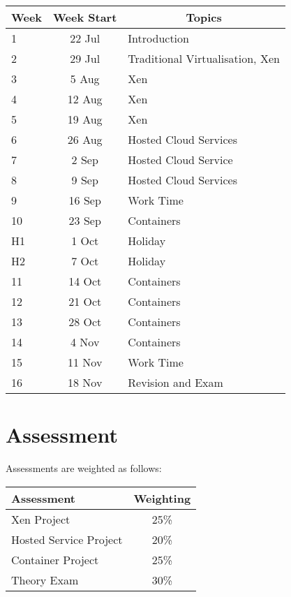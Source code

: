 \documentclass{article}
\begin{document}
\renewcommand{\arraystretch}{1.5}
\begin{tabular}{|l|c|l|}
\hline
 Week & Week Start & \multicolumn{1}{c|}{Topics}             \\ \hline
 1    & 22 Jul     & Introduction                            \\ \hline
 2    & 29 Jul     & Traditional Virtualisation, Xen         \\ \hline
 3    &  5 Aug     & Xen                                     \\ \hline
 4    & 12 Aug     & Xen                                     \\ \hline
 5    & 19 Aug     & Xen                                     \\ \hline
 6    & 26 Aug     & Hosted Cloud Services                   \\ \hline
 7    & 2  Sep     & Hosted Cloud Service                    \\ \hline
 8    & 9  Sep     & Hosted Cloud Services                   \\ \hline
 9    & 16 Sep     & Work Time                               \\ \hline
 10   & 23 Sep     & Containers                              \\ \hline
 H1   & 1  Oct     & Holiday                                 \\ \hline
 H2   & 7  Oct     & Holiday                                 \\ \hline
 11   & 14 Oct     & Containers                              \\ \hline
 12   & 21 Oct     & Containers                              \\ \hline
 13   & 28 Oct     & Containers                              \\ \hline
 14   & 4  Nov     & Containers                              \\ \hline
 15   & 11 Nov     & Work Time                               \\ \hline
 16   & 18 Nov     & Revision and Exam                       \\ \hline
\end{tabular}

\section*{Assessment}

Assessments are weighted as follows: \\
\begin{tabular}{|l|c|}
\hline
Assessment                  &  Weighting \\ \hline
Xen Project                 &  25\% \\ \hline
Hosted Service Project      &  20\% \\ \hline
Container Project           &  25\% \\ \hline
Theory Exam                 &  30\% \\ \hline
\end{tabular}
\end{document}
